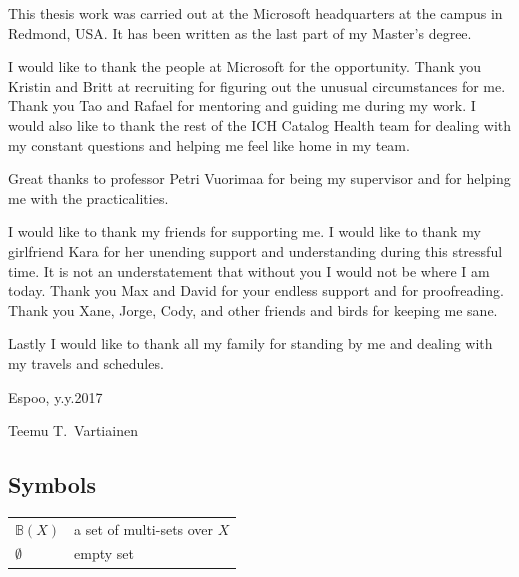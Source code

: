 \documentclass[english,12pt,a4paper,pdftex,sci,utf8]{aaltothesis}
\theoremstyle{definition}
\begin{document}

This thesis work was carried out at the Microsoft headquarters at the campus in Redmond, USA.
It has been written as the last part of my Master's degree.

I would like to thank the people at Microsoft for the opportunity.
Thank you Kristin and Britt at recruiting for figuring out the unusual circumstances for me.
Thank you Tao and Rafael for mentoring and guiding me during my work.
I would also like to thank the rest of the ICH Catalog Health team for dealing with my constant questions
and helping me feel like home in my team.

Great thanks to professor Petri Vuorimaa for being my supervisor and for helping me with the practicalities.

I would like to thank my friends for supporting me.
I would like to thank my girlfriend Kara for her unending support and understanding during this stressful time.
It is not an understatement that without you I would not be where I am today.
Thank you Max and David for your endless support and for proofreading.
Thank you Xane, Jorge, Cody, and other friends and birds for keeping me sane.

Lastly I would like to thank all my family for standing by me and dealing with my travels and schedules.



\vspace{5cm}
Espoo, y.y.2017

\vspace{5mm}
{\hfill Teemu T.\ Vartiainen \hspace{1cm}}

\newpage


\thesistableofcontents



\subsection*{Symbols}

\begin{tabular}{ll}
$\mathbb{B}(X)$  & a set of multi-sets over $X$ \\
$\emptyset$      & empty set \\
\end{tabular}
\end{document}
